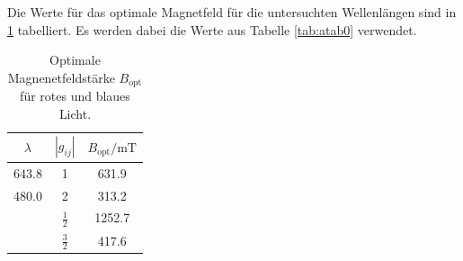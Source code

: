 Die Werte für das optimale Magnetfeld für die untersuchten Wellenlängen sind in \ref{tab:tabelle} tabelliert. Es werden
dabei die Werte aus Tabelle \ref{tab:atab0} verwendet.
\FloatBarrier
\begin{table}[h]
    \centering
    \caption{Optimale Magnenetfeldstärke $B_{\text{opt}}$ für rotes und blaues Licht.}
    \label{tab:tabelle}
    \begin{tabular}{c c c}
        \toprule
        {$\lambda$} & {$\left|g_{ij}\right|$} & {$B_{\text{opt}} / \text{mT}$} \\
        \midrule
        643.8 & 1  & 631.9 \\
        480.0 & 2 & 313.2 \\
              & $\frac{1}{2}$ & 1252.7 \\
              & $\frac{3}{2}$ & 417.6 \\
        \bottomrule
    \end{tabular}
\end{table}
\FloatBarrier
\noindent
